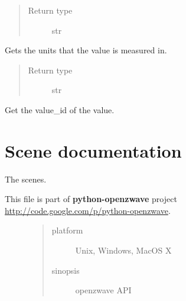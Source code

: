 \documentclass[letterpaper,10pt,english]{sphinxmanual}
\begin{document}
\begin{fulllineitems}
\begin{fulllineitems}
\begin{quote}
\begin{description}
\item[{Return type}] \leavevmode
str

\end{description}\end{quote}

\end{fulllineitems}


\begin{fulllineitems}
\label{value:openzwave.value.ZWaveValue.units}
Gets the units that the value is measured in.
\begin{quote}\begin{description}
\item[{Return type}] \leavevmode
str

\end{description}\end{quote}

\end{fulllineitems}


\begin{fulllineitems}
\label{value:openzwave.value.ZWaveValue.value_id}
Get the value\_id of the value.

\end{fulllineitems}


\end{fulllineitems}



\section{Scene documentation}
\label{scene:scene-documentation}\label{scene::doc}
The scenes.
\label{scene:module-openzwave.scene}\label{scene:module-openzwave.scene}\begin{description}
\item[{This file is part of \textbf{python-openzwave} project \href{http://code.google.com/p/python-openzwave}{http://code.google.com/p/python-openzwave}.}] \leavevmode\begin{quote}\begin{description}
\item[{platform}] \leavevmode
Unix, Windows, MacOS X

\item[{sinopsis}] \leavevmode
openzwave API

\end{description}\end{quote}

\end{description}
\end{document}
